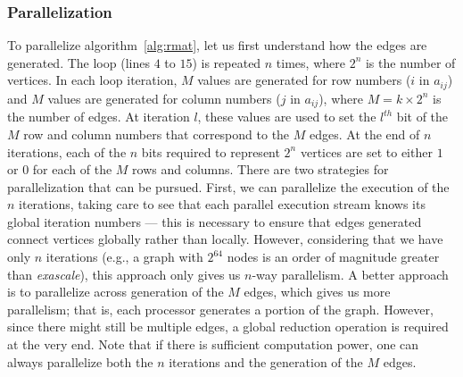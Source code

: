 %
%
\subsubsection{Parallelization}
%
To parallelize algorithm~\ref{alg:rmat}, let us first understand how the edges 
are generated.
%
The  loop (lines $4$ to $15$) is repeated $n$ times, where $2^n$ is 
the number of vertices.
%
In each loop iteration, $M$  values are generated for row numbers
($i$ in $a_{ij}$) and $M$  values are generated for column
numbers ($j$ in $a_{ij}$), where $M=k\times{}2^n$ is the number of edges.
%
At iteration $l$, these  values are used to set the $l^{th}$ bit
of the $M$ row and column numbers that correspond to the $M$ edges.
%
At the end of $n$ iterations, each of the $n$ bits required to represent $2^n$
vertices are set to either $1$ or $0$ for each of the $M$ rows and columns.
%
There are two strategies for parallelization that can be pursued.
%
First, we can parallelize the execution of the $n$ iterations, taking care to
see that each parallel execution stream knows its global iteration numbers ---
this is necessary to ensure that edges generated connect vertices globally
rather than locally.
%
However, considering that we have only $n$ iterations (e.g., a graph with
$2^{64}$ nodes is an order of magnitude greater than \textit{exascale}), this
approach only gives us $n$-way parallelism.
%
A better approach is to parallelize across generation of the $M$ edges, which
gives us more parallelism; that is, each processor generates a portion of the 
graph.
%
However, since there might still be multiple edges, a global reduction
operation is required at the very end.
%
Note that if there is sufficient computation power, one can always parallelize
both the $n$ iterations and the generation of the $M$ edges.
